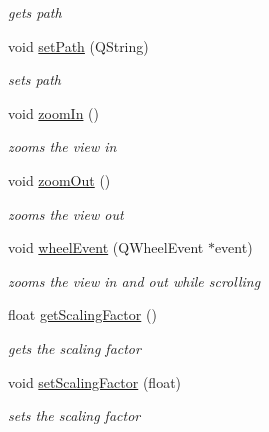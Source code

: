 \begin{DoxyCompactItemize}
\begin{DoxyCompactList}\small\item\em gets path \end{DoxyCompactList}\item 
\hypertarget{class_my_area_ab1f574dcb5318131128deb076743f01a}{void \hyperlink{class_my_area_ab1f574dcb5318131128deb076743f01a}{set\-Path} (\-Q\-String)}\label{class_my_area_ab1f574dcb5318131128deb076743f01a}

\begin{DoxyCompactList}\small\item\em sets path \end{DoxyCompactList}\item 
\hypertarget{class_my_area_ae9e0f83ea174d928e90149e510a1ba6a}{void \hyperlink{class_my_area_ae9e0f83ea174d928e90149e510a1ba6a}{zoom\-In} ()}\label{class_my_area_ae9e0f83ea174d928e90149e510a1ba6a}

\begin{DoxyCompactList}\small\item\em zooms the view in \end{DoxyCompactList}\item 
\hypertarget{class_my_area_af3c32c10d3db89a2efba9c23ec029fe0}{void \hyperlink{class_my_area_af3c32c10d3db89a2efba9c23ec029fe0}{zoom\-Out} ()}\label{class_my_area_af3c32c10d3db89a2efba9c23ec029fe0}

\begin{DoxyCompactList}\small\item\em zooms the view out \end{DoxyCompactList}\item 
\hypertarget{class_my_area_ae3d11ed25247a029074808e88bae22f0}{void \hyperlink{class_my_area_ae3d11ed25247a029074808e88bae22f0}{wheel\-Event} (\-Q\-Wheel\-Event $\ast$event)}\label{class_my_area_ae3d11ed25247a029074808e88bae22f0}

\begin{DoxyCompactList}\small\item\em zooms the view in and out while scrolling \end{DoxyCompactList}\item 
\hypertarget{class_my_area_a7ad7ab4856b78cc6d8f18f1a7e6dd784}{float \hyperlink{class_my_area_a7ad7ab4856b78cc6d8f18f1a7e6dd784}{get\-Scaling\-Factor} ()}\label{class_my_area_a7ad7ab4856b78cc6d8f18f1a7e6dd784}

\begin{DoxyCompactList}\small\item\em gets the scaling factor \end{DoxyCompactList}\item 
\hypertarget{class_my_area_ac80eebebdb761f1189b4d7c020316596}{void \hyperlink{class_my_area_ac80eebebdb761f1189b4d7c020316596}{set\-Scaling\-Factor} (float)}\label{class_my_area_ac80eebebdb761f1189b4d7c020316596}

\begin{DoxyCompactList}\small\item\em sets the scaling factor \end{DoxyCompactList}\end{DoxyCompactItemize}
